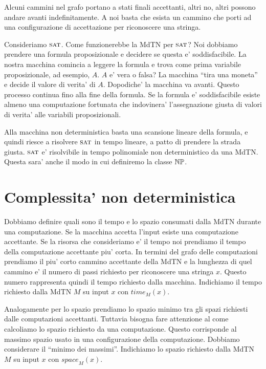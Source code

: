Alcuni cammini nel grafo portano a stati finali accettanti, altri no, altri possono andare avanti
indefinitamente. A noi basta che esista un cammino che porti ad una configurazione di accettazione
per riconoscere una stringa. 


Consideriamo $\textsc{sat}$. Come funzionerebbe la MdTN per $\textsc{sat}$? Noi dobbiamo prendere una formula
proposizionale e decidere se questa e' soddisfacibile. La nostra macchina comincia a leggere la
formula e trova come prima variabile proposizionale, ad esempio, $A$. $A$ e' vera o falsa? La
macchina ``tira una moneta'' e decide il valore di verita' di $A$. Dopodiche' la macchina va avanti.
Questo processo continua fino alla fine della formula. Se la formula e' soddisfacibile esiste almeno
una computazione fortunata che indovinera' l'assegnazione giusta di valori di verita' alle variabili
proposizionali.

Alla macchina non deterministica basta una scansione lineare della formula, e quindi riesce a
risolvere $\textsc{sat}$ in tempo lineare, a patto di prendere la strada giusta. $\textsc{sat}$ e' risolvibile in
tempo polinomiale non deterministico da una MdTN. Questa sara' anche il modo in cui definiremo la
classe $\mathbb{NP}$.

\section{Complessita' non deterministica}

Dobbiamo definire quali sono il tempo e lo spazio consumati dalla MdTN durante una computazione. Se
la macchina accetta l'input esiste una computazione accettante. Se la risorsa che consideriamo e' il
tempo noi prendiamo il tempo della computazione accettante piu' corta. In termini del grafo delle
computazioni prendiamo il piu' corto cammino accettante della MdTN e la lunghezza di quel cammino e'
il numero di passi richiesto per riconoscere una stringa $x$. Questo numero rappresenta quindi il
tempo richiesto dalla macchina. Indichiamo il tempo richiesto dalla MdTN $M$ su input $x$ con
$\textit{time}_{M}(x)$.

Analogamente per lo spazio prendiamo lo spazio minimo tra gli spazi richiesti dalle computazioni
accettanti. Tuttavia bisogna fare attenzione al come calcoliamo lo spazio richiesto da una
computazione. Questo corrisponde al massimo spazio usato in una configurazione della computazione.
Dobbiamo considerare il ``minimo dei massimi''. Indichiamo lo spazio richiesto dalla MdTN $M$ su
input $x$ con $\textit{space}_{M}(x)$.

